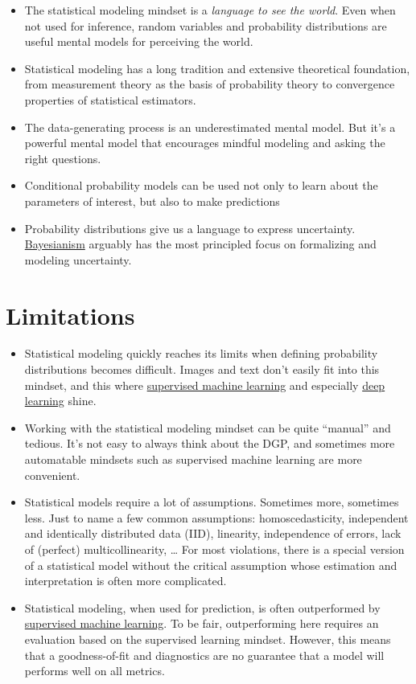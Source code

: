 \documentclass[
  10pt,
]{scrbook}
\providecommand{\tightlist}{%
  \setlength{\itemsep}{0pt}\setlength{\parskip}{0pt}}
\begin{document}
\begin{itemize}
\tightlist
\item
  The statistical modeling mindset is a \emph{language to see the world}. Even when not used for inference, random variables and probability distributions are useful mental models for perceiving the world.
\item
  Statistical modeling has a long tradition and extensive theoretical foundation, from measurement theory as the basis of probability theory to convergence properties of statistical estimators.
\item
  The data-generating process is an underestimated mental model. But it's a powerful mental model that encourages mindful modeling and asking the right questions.
\item
  Conditional probability models can be used not only to learn about the parameters of interest, but also to make predictions
\item
  Probability distributions give us a language to express uncertainty. \protect\hyperlink{bayesianism}{Bayesianism} arguably has the most principled focus on formalizing and modeling uncertainty.
\end{itemize}

\hypertarget{limitations}{%
\section{Limitations}\label{limitations}}

\begin{itemize}
\tightlist
\item
  Statistical modeling quickly reaches its limits when defining probability distributions becomes difficult. Images and text don't easily fit into this mindset, and this where \protect\hyperlink{supervised-ml}{supervised machine learning} and especially \protect\hyperlink{deep-learning}{deep learning} shine.
\item
  Working with the statistical modeling mindset can be quite ``manual'' and tedious. It's not easy to always think about the DGP, and sometimes more automatable mindsets such as supervised machine learning are more convenient.
\item
  Statistical models require a lot of assumptions. Sometimes more, sometimes less. Just to name a few common assumptions: homoscedasticity, independent and identically distributed data (IID), linearity, independence of errors, lack of (perfect) multicollinearity, \ldots{} For most violations, there is a special version of a statistical model without the critical assumption whose estimation and interpretation is often more complicated.
\item
  Statistical modeling, when used for prediction, is often outperformed by \protect\hyperlink{supervised-ml}{supervised machine learning}. To be fair, outperforming here requires an evaluation based on the supervised learning mindset. However, this means that a goodness-of-fit and diagnostics are no guarantee that a model will performs well on all metrics.
\end{itemize}
\end{document}
